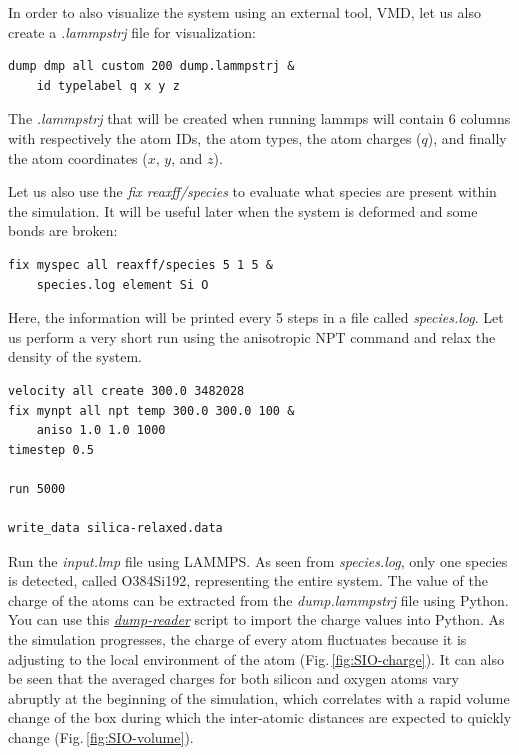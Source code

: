\documentclass[9pt,tutorial]{livecoms}
\begin{document}
In order to also visualize the system using an external tool, VMD, let us also
create a \textit{.lammpstrj} file for visualization:
\begin{lstlisting}
dump dmp all custom 200 dump.lammpstrj &
    id typelabel q x y z
\end{lstlisting}
The \textit{.lammpstrj} that will be created when running lammps will contain
6 columns with respectively the atom IDs, the atom types, the atom charges ($q$),
and finally the atom coordinates ($x$, $y$, and $z$).

Let us also use the \textit{fix reaxff/species} to evaluate what species are
present within the simulation. It will be useful later when the system is deformed
and some bonds are broken:
\begin{lstlisting}
fix myspec all reaxff/species 5 1 5 &
    species.log element Si O
\end{lstlisting}
Here, the information will be printed every 5 steps in a file called \textit{species.log}.
Let us perform a very short run using the anisotropic NPT command and relax the
density of the system.
\begin{lstlisting}
velocity all create 300.0 3482028
fix mynpt all npt temp 300.0 300.0 100 &
    aniso 1.0 1.0 1000
timestep 0.5

run 5000

write_data silica-relaxed.data
\end{lstlisting}
Run the \textit{input.lmp} file using LAMMPS. As seen from \textit{species.log},
only one species is detected, called O384Si192, representing the entire system.
The value of the charge of the atoms can be extracted from the \textit{dump.lammpstrj}
file using Python. You can use this
\href{https://raw.githubusercontent.com/lammpstutorials/lammpstutorials-article/main/files/tutorial5/dump-reader.py}{\textit{dump-reader}}
script to import the charge values into Python.
As the simulation progresses, the charge of every atom fluctuates
because it is adjusting to the local environment of the atom (Fig.\,\ref{fig:SIO-charge}).
It can also be seen that the averaged charges for both silicon and oxygen
atoms vary abruptly at the beginning of the simulation, which correlates with
a rapid volume change of the box during which the inter-atomic distances are
expected to quickly change (Fig.\,\ref{fig:SIO-volume}).
\end{document}
